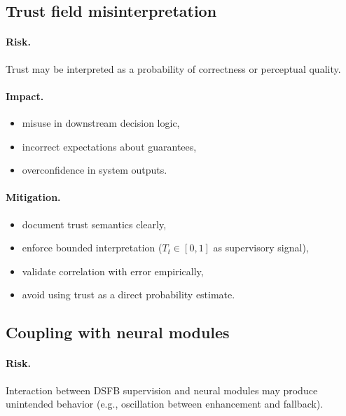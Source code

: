 \documentclass[11pt]{article}
\theoremstyle{definition}
\theoremstyle{plain}
\begin{document}

\subsection{Trust field misinterpretation}

\paragraph{Risk.}
Trust may be interpreted as a probability of correctness or perceptual quality.

\paragraph{Impact.}
\begin{itemize}[leftmargin=1.5em]
    \item misuse in downstream decision logic,
    \item incorrect expectations about guarantees,
    \item overconfidence in system outputs.
\end{itemize}

\paragraph{Mitigation.}
\begin{itemize}[leftmargin=1.5em]
    \item document trust semantics clearly,
    \item enforce bounded interpretation ($T_t\in[0,1]$ as supervisory signal),
    \item validate correlation with error empirically,
    \item avoid using trust as a direct probability estimate.
\end{itemize}


\subsection{Coupling with neural modules}

\paragraph{Risk.}
Interaction between DSFB supervision and neural modules may produce unintended behavior (e.g., oscillation between enhancement and fallback).
\end{document}
